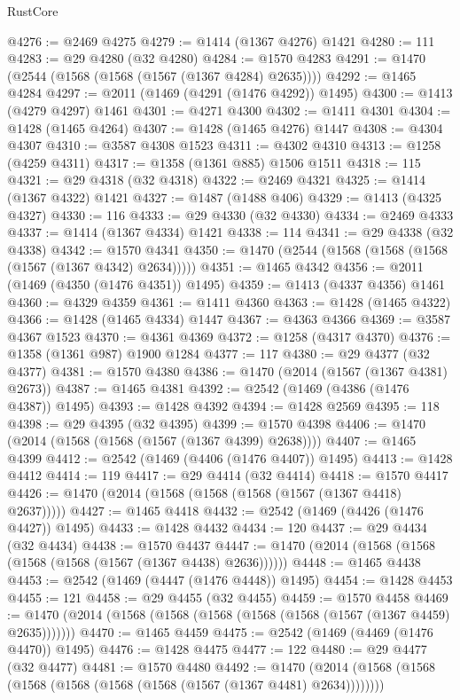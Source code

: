 \begin{lexlean}{RustCore}
\begin{coremodule}
{\begin{coremodule}
{{{{{{{{{{{{{{{{{{{{{{{{{{{{{{{{{{{{{{{{{{{{{{{@4276 := @2469 @4275
@4279 := @1414 (@1367 @4276) @1421
@4280 := 111
@4283 := @29 @4280 (@32 @4280)
@4284 := @1570 @4283
@4291 := @1470 (@2544 (@1568 (@1568 (@1567 (@1367 @4284) @2635))))
@4292 := @1465 @4284
@4297 := @2011 (@1469 (@4291 (@1476 @4292)) @1495)
@4300 := @1413 (@4279 @4297) @1461
@4301 := @4271 @4300
@4302 := @1411 @4301
@4304 := @1428 (@1465 @4264)
@4307 := @1428 (@1465 @4276) @1447
@4308 := @4304 @4307
@4310 := @3587 @4308 @1523
@4311 := @4302 @4310
@4313 := @1258 (@4259 @4311)
@4317 := @1358 (@1361 @885) @1506 @1511
@4318 := 115
@4321 := @29 @4318 (@32 @4318)
@4322 := @2469 @4321
@4325 := @1414 (@1367 @4322) @1421
@4327 := @1487 (@1488 @406)
@4329 := @1413 (@4325 @4327)
@4330 := 116
@4333 := @29 @4330 (@32 @4330)
@4334 := @2469 @4333
@4337 := @1414 (@1367 @4334) @1421
@4338 := 114
@4341 := @29 @4338 (@32 @4338)
@4342 := @1570 @4341
@4350 := @1470 (@2544 (@1568 (@1568 (@1568 (@1567 (@1367 @4342) @2634)))))
@4351 := @1465 @4342
@4356 := @2011 (@1469 (@4350 (@1476 @4351)) @1495)
@4359 := @1413 (@4337 @4356) @1461
@4360 := @4329 @4359
@4361 := @1411 @4360
@4363 := @1428 (@1465 @4322)
@4366 := @1428 (@1465 @4334) @1447
@4367 := @4363 @4366
@4369 := @3587 @4367 @1523
@4370 := @4361 @4369
@4372 := @1258 (@4317 @4370)
@4376 := @1358 (@1361 @987) @1900 @1284
@4377 := 117
@4380 := @29 @4377 (@32 @4377)
@4381 := @1570 @4380
@4386 := @1470 (@2014 (@1567 (@1367 @4381) @2673))
@4387 := @1465 @4381
@4392 := @2542 (@1469 (@4386 (@1476 @4387)) @1495)
@4393 := @1428 @4392
@4394 := @1428 @2569
@4395 := 118
@4398 := @29 @4395 (@32 @4395)
@4399 := @1570 @4398
@4406 := @1470 (@2014 (@1568 (@1568 (@1567 (@1367 @4399) @2638))))
@4407 := @1465 @4399
@4412 := @2542 (@1469 (@4406 (@1476 @4407)) @1495)
@4413 := @1428 @4412
@4414 := 119
@4417 := @29 @4414 (@32 @4414)
@4418 := @1570 @4417
@4426 := @1470 (@2014 (@1568 (@1568 (@1568 (@1567 (@1367 @4418) @2637)))))
@4427 := @1465 @4418
@4432 := @2542 (@1469 (@4426 (@1476 @4427)) @1495)
@4433 := @1428 @4432
@4434 := 120
@4437 := @29 @4434 (@32 @4434)
@4438 := @1570 @4437
@4447 := @1470 (@2014 (@1568 (@1568 (@1568 (@1568 (@1567 (@1367 @4438) @2636))))))
@4448 := @1465 @4438
@4453 := @2542 (@1469 (@4447 (@1476 @4448)) @1495)
@4454 := @1428 @4453
@4455 := 121
@4458 := @29 @4455 (@32 @4455)
@4459 := @1570 @4458
@4469 := @1470 (@2014 (@1568 (@1568 (@1568 (@1568 (@1568 (@1567 (@1367 @4459) @2635)))))))
@4470 := @1465 @4459
@4475 := @2542 (@1469 (@4469 (@1476 @4470)) @1495)
@4476 := @1428 @4475
@4477 := 122
@4480 := @29 @4477 (@32 @4477)
@4481 := @1570 @4480
@4492 := @1470 (@2014 (@1568 (@1568 (@1568 (@1568 (@1568 (@1568 (@1567 (@1367 @4481) @2634))))))))
}}}}}}}}}}}}}}}}}}}}}}}}}}}}}}}}}}}}}}}}}}}}}}}
\end{coremodule}}
\end{coremodule}
\end{lexlean}

